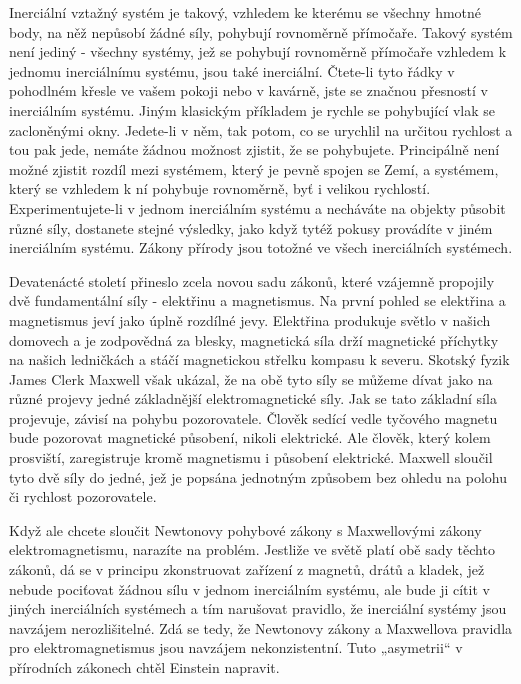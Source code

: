   Inerciální vztažný systém je takový, vzhledem ke kterému se všechny hmotné body, na něž nepůsobí
  žádné síly, pohybují rovnoměrně přímočaře. Takový systém není jediný - všechny systémy, jež se
  pohybují rovnoměrně přímočaře vzhledem k jednomu inerciálnímu systému, jsou také inerciální.
  Čtete-li tyto řádky v pohodlném křesle ve vašem pokoji nebo v kavárně, jste se značnou přesností v
  inerciálním systému. Jiným klasickým příkladem je rychle se pohybující vlak se zacloněnými okny.
  Jedete-li v něm, tak potom, co se urychlil na určitou rychlost a tou pak jede, nemáte žádnou
  možnost zjistit, že se pohybujete. Principálně není možné zjistit rozdíl mezi systémem, který je
  pevně spojen se Zemí, a systémem, který se vzhledem k ní pohybuje rovnoměrně, byť i velikou
  rychlostí. Experimentujete-li v jednom inerciálním systému a necháváte na objekty působit různé
  síly, dostanete stejné výsledky, jako když tytéž pokusy provádíte v jiném inerciálním systému.
  Zákony přírody jsou totožné ve všech inerciálních systémech. 

  Devatenácté století přineslo zcela novou sadu zákonů, které vzájemně propojily dvě fundamentální
  síly - elektřinu a magnetismus. Na první pohled se elektřina a magnetismus jeví jako úplně
  rozdílné jevy. Elektřina produkuje světlo v našich domovech a je zodpovědná za blesky, magnetická
  síla drží magnetické příchytky na našich ledničkách a stáčí magnetickou střelku kompasu k severu.
  Skotský fyzik James Clerk Maxwell však ukázal, že na obě tyto síly se můžeme dívat jako na různé
  projevy jedné základnější elektromagnetické síly. Jak se tato základní síla projevuje, závisí na
  pohybu pozorovatele. Člověk sedící vedle tyčového magnetu bude pozorovat magnetické působení,
  nikoli elektrické. Ale člověk, který kolem prosviští, zaregistruje kromě magnetismu i působení
  elektrické. Maxwell sloučil tyto dvě síly do jedné, jež je popsána jednotným způsobem bez ohledu
  na polohu či rychlost pozorovatele. 

  Když ale chcete sloučit Newtonovy pohybové zákony s Maxwellovými zákony elektromagnetismu,
  narazíte na problém. Jestliže ve světě platí obě sady těchto zákonů, dá se v principu zkonstruovat
  zařízení z magnetů, drátů a kladek, jež nebude pociťovat žádnou sílu v jednom inerciálním systému,
  ale bude ji cítit v jiných inerciálních systémech a tím narušovat pravidlo, že inerciální systémy
  jsou navzájem nerozlišitelné. Zdá se tedy, že Newtonovy zákony a Maxwellova pravidla pro
  elektromagnetismus jsou navzájem nekonzistentní. Tuto „asymetrii“ v přírodních zákonech chtěl
  Einstein napravit. 

